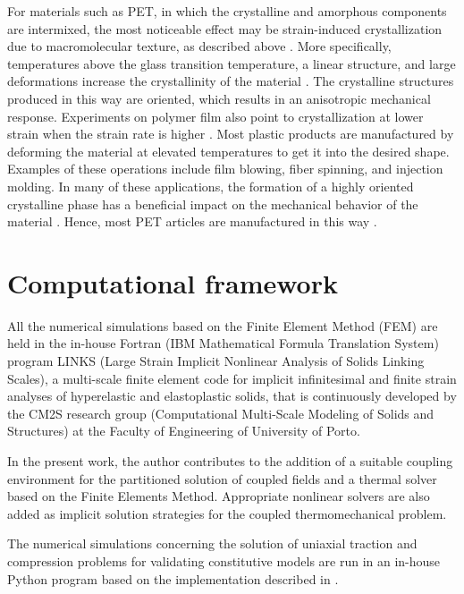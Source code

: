 For materials such as PET, in which the crystalline and amorphous components are intermixed, the most noticeable effect may be strain-induced crystallization due to macromolecular texture, as described above \citep{wardIntroductionMechanicalProperties2004}.
More specifically, temperatures above the glass transition temperature, a linear structure, and large deformations increase the crystallinity of the material \citep{ahziModelingDeformationBehavior2003}.
The crystalline structures produced in this way are oriented, which results in an anisotropic mechanical response.
Experiments on polymer film also point to crystallization at lower strain when the strain rate is higher \citep{raoStudyStraininducedCrystallization2001}.
Most plastic products are manufactured by deforming the material at elevated temperatures to get it into the desired shape.
Examples of these operations include film blowing, fiber spinning, and injection molding.
In many of these applications, the formation of a highly oriented crystalline phase has a beneficial impact on the mechanical behavior of the material \citep{dairaniehPhenomenologicalModelFlowInduced1999, raoStudyStraininducedCrystallization2001}.
Hence, most PET articles are manufactured in this way \citep{boyceConstitutiveModelFinite2000, raoStudyStraininducedCrystallization2001, makradiTwophaseSelfconsistentModel2005}.


\section{Computational framework}

All the numerical simulations based on the Finite Element Method (FEM) are held in the in-house Fortran (IBM Mathematical Formula Translation System) program LINKS (Large Strain Implicit Nonlinear Analysis of Solids Linking Scales), a multi-scale finite element code for implicit infinitesimal and finite strain analyses of hyperelastic and elastoplastic solids, that is continuously developed by the CM2S research group (Computational Multi-Scale Modeling of Solids and Structures) at the Faculty of Engineering of University of Porto.

In the present work, the author contributes to the addition of a suitable coupling environment for the partitioned solution of coupled fields and a thermal solver based on the Finite Elements Method.
Appropriate nonlinear solvers are also added as implicit solution strategies for the coupled thermomechanical problem.

The numerical simulations concerning the solution of uniaxial traction and compression problems for validating constitutive models are run in an in-house Python program based on the implementation described in \cite{bergstromMechanicsSolidPolymers2015}.

